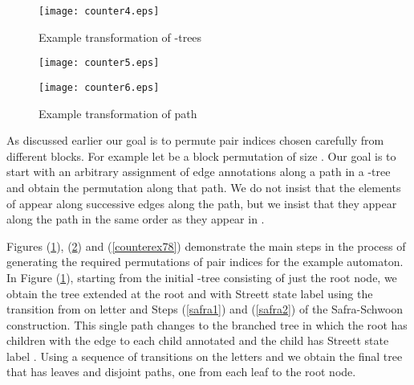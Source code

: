 \documentclass[3p]{elsarticle}
\begin{document}
\begin{figure}
\begin{center}
\texttt{[image: counter4.eps]}
\end{center}
\caption{Example transformation of -trees}
\label{counterex4}
\end{figure}





\begin{figure}[ht]
\begin{minipage}[b]{0.48\linewidth}
\begin{center}
\texttt{[image: counter5.eps]}
\end{center}
\label{counterex5}
\end{minipage}
\hspace{5mm}
\begin{minipage}[b]{0.48\linewidth}
\begin{center}
\texttt{[image: counter6.eps]}
\end{center}
\label{counterex6}
\end{minipage}
\caption{Example transformation of path }
\label{counterex56}
\end{figure}

As discussed earlier our goal is to permute  pair indices chosen carefully
from different blocks. For example let  be a block permutation of size . Our goal is to
start with an arbitrary assignment of edge annotations along a path in a -tree and obtain the permutation  along that path. We do not insist that
the elements of  appear along successive edges along the path, but we
insist that they appear along the path in the same order as they appear in
.

Figures (\ref{counterex4}), (\ref{counterex56}) and (\ref{counterex78})
demonstrate the main steps in the process of generating the required
permutations of pair indices for the example automaton. In Figure
(\ref{counterex4}), starting from the initial -tree consisting of just
the root node, we obtain the tree extended at the root and with Streett state
label  using the
transition from  on letter  and Steps (\ref{safra1}) and
(\ref{safra2}) of the Safra-Schwoon construction. This single path changes to
the branched tree in which the root has  children with the edge to each child
annotated  and the  child has Streett state label .
Using a sequence of transitions on the letters  and  we
obtain the final tree that has  leaves and  disjoint paths, one from each
leaf to the root node. 
\end{document}
